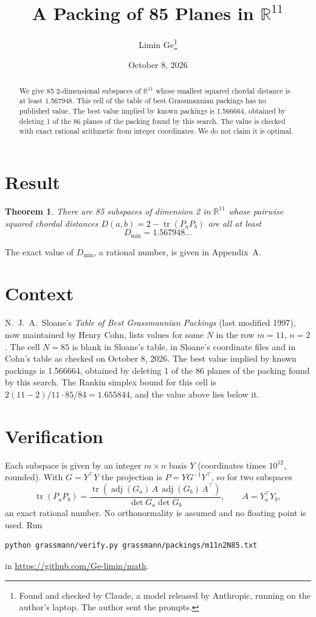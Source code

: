 \documentclass[11pt,a4paper]{article}
\title{A Packing of 85 Planes in $\mathbb{R}^{11}$}
\author{Limin Ge\thanks{Found and checked by Claude, a model released by Anthropic, running on the author's laptop. The author sent the prompts.}}
\date{October 8, 2026}
\newtheorem*{theorem}{Theorem}
\begin{document}
\maketitle
\begin{abstract}
We give 85 2-dimensional subspaces of $\mathbb{R}^{11}$ whose smallest squared chordal distance is at least 1.567948. This cell of the table of best Grassmannian packings has no published value. The best value implied by known packings is 1.566664, obtained by deleting 1 of the 86 planes of the packing found by this search. The value is checked with exact rational arithmetic from integer coordinates. We do not claim it is optimal.
\end{abstract}

\section{Result}
\begin{theorem}
There are 85 subspaces of dimension 2 in $\mathbb{R}^{11}$ whose pairwise squared chordal distances $D(a,b) = 2 - \operatorname{tr}(P_aP_b)$ are all at least
\[ D_{\min} = 1.567948\ldots \]
\end{theorem}
The exact value of $D_{\min}$, a rational number, is given in Appendix~A.


\section{Context}
N.~J.~A.~Sloane's \emph{Table of Best Grassmannian Packings} (last modified 1997), now maintained by Henry Cohn, lists values for some $N$ in the row $m=11$, $n=2$. The cell $N=85$ is blank in Sloane's table, in Sloane's coordinate files and in Cohn's table as checked on October 8, 2026. The best value implied by known packings is 1.566664, obtained by deleting 1 of the 86 planes of the packing found by this search. The Rankin simplex bound for this cell is $2(11-2)/11\cdot 85/84 = 1.655844$, and the value above lies below it.


\section{Verification}
Each subspace is given by an integer $m\times n$ basis $Y$ (coordinates times $10^{12}$, rounded). With $G=Y^\top Y$ the projection is $P=YG^{-1}Y^\top$, so for two subspaces
\[ \operatorname{tr}(P_aP_b)=\frac{\operatorname{tr}(\operatorname{adj}(G_a)\,A\,\operatorname{adj}(G_b)\,A^\top)}{\det G_a\det G_b},\qquad A=Y_a^\top Y_b, \]
an exact rational number. No orthonormality is assumed and no floating point is used. Run
\begin{verbatim}
python grassmann/verify.py grassmann/packings/m11n2N85.txt
\end{verbatim}
in \url{https://github.com/Ge-limin/math}.
\end{document}
